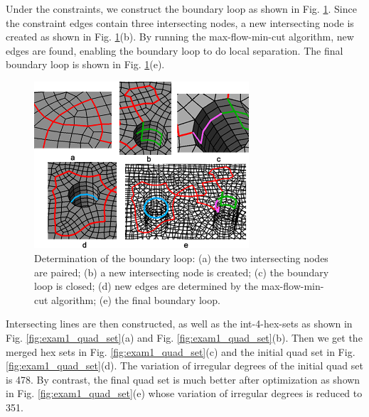 \documentclass[final,5p,times,twocolumn]{elsarticle}
\begin{document}
Under the constraints, we construct the boundary loop as shown in Fig. \ref{fig:exam1_bound_loop}. Since the constraint edges contain three intersecting nodes, a new intersecting node is created as shown in Fig. \ref{fig:exam1_bound_loop}(b). By running the max-flow-min-cut algorithm, new edges are found, enabling the boundary loop to do local separation. The final boundary loop is shown in Fig. \ref{fig:exam1_bound_loop}(e).

\begin{figure}[htbp]
\begin{center}
\includegraphics[width=8cm]{figures/exam1_bound_loop.png}
\caption{Determination of the boundary loop: (a) the two intersecting nodes are paired; (b) a new intersecting node is created; (c) the boundary loop is closed; (d) new edges are determined by the max-flow-min-cut algorithm; (e) the final boundary loop.}
\label{fig:exam1_bound_loop}
\end{center}
\end{figure}

Intersecting lines are then constructed, as well as the int-4-hex-sets as shown in Fig. \ref{fig:exam1_quad_set}(a) and Fig. \ref{fig:exam1_quad_set}(b). Then we get the merged hex sets in Fig. \ref{fig:exam1_quad_set}(c) and the initial quad set in Fig. \ref{fig:exam1_quad_set}(d). The variation of irregular degrees of the initial quad set is 478. By contrast, the final quad set is much better after optimization as shown in Fig. \ref{fig:exam1_quad_set}(e) whose variation of irregular degrees is reduced to 351.
\end{document}
